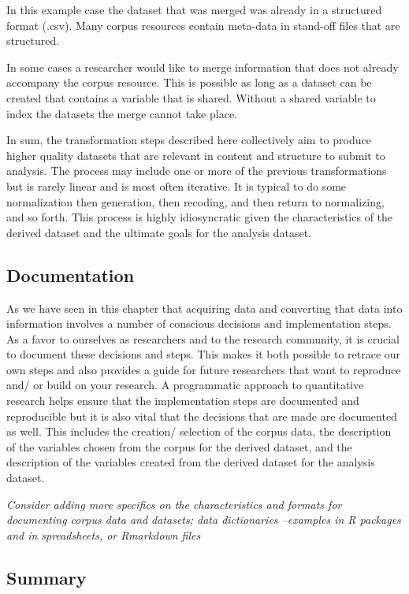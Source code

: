 \documentclass[
]{article}
\begin{document}
In this example case the dataset that was merged was already in a structured format (.csv). Many corpus resources contain meta-data in stand-off files that are structured.

In some cases a researcher would like to merge information that does not already accompany the corpus resource. This is possible as long as a dataset can be created that contains a variable that is shared. Without a shared variable to index the datasets the merge cannot take place.

In sum, the transformation steps described here collectively aim to produce higher quality datasets that are relevant in content and structure to submit to analysis. The process may include one or more of the previous transformations but is rarely linear and is most often iterative. It is typical to do some normalization then generation, then recoding, and then return to normalizing, and so forth. This process is highly idiosyncratic given the characteristics of the derived dataset and the ultimate goals for the analysis dataset.

\hypertarget{documentation}{%
\subsection{Documentation}\label{documentation}}

As we have seen in this chapter that acquiring data and converting that data into information involves a number of conscious decisions and implementation steps. As a favor to ourselves as researchers and to the research community, it is crucial to document these decisions and steps. This makes it both possible to retrace our own steps and also provides a guide for future researchers that want to reproduce and/ or build on your research. A programmatic approach to quantitative research helps ensure that the implementation steps are documented and reproducible but it is also vital that the decisions that are made are documented as well. This includes the creation/ selection of the corpus data, the description of the variables chosen from the corpus for the derived dataset, and the description of the variables created from the derived dataset for the analysis dataset.

\emph{Consider adding more specifics on the characteristics and formats for documenting corpus data and datasets; data dictionaries --examples in R packages and in spreadsheets, or Rmarkdown files}

\hypertarget{summary-1}{%
\subsection{Summary}\label{summary-1}}
\end{document}

